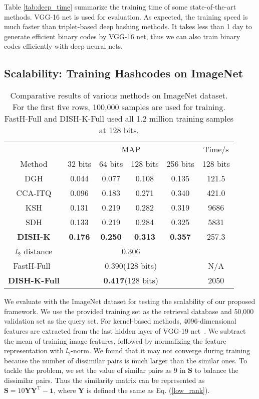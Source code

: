 \documentclass[conference]{IEEEtran}
\begin{document}
Table \ref{tab:deep_time} summarize the training time of some state-of-the-art methods. VGG-16 net is used for evaluation. As expected, the training speed is much faster than triplet-based deep hashing methods. It takes less than 1 day to generate efficient binary codes by VGG-16 net, thus we can also train binary codes efficiently with deep neural nets.


\subsection{Scalability: Training Hashcodes on ImageNet}

\begin{table}[t]
    \centering
    \footnotesize
    \begin{tabular}{c|cccc|c}
        \hline
         & \multicolumn{4}{c|}{MAP} & Time/s \\
        Method & 32 bits & 64 bits & 128 bits & 256 bits & 128 bits \\
        \hline
        DGH & 0.044 & 0.077 & 0.108 & 0.135 & 121.5 \\
        CCA-ITQ & 0.096 & 0.183 & 0.271 & 0.340 & 421.0 \\
        KSH & 0.131 & 0.219 & 0.282 & 0.319 & 9686 \\
        SDH & 0.133 & 0.219 & 0.284 & 0.325 & 5831 \\
        \textbf{DISH-K} & \textbf{0.176} & \textbf{0.250} & \textbf{0.313} & \textbf{0.357} & 257.3 \\
        \hline
        $l_2$ distance & \multicolumn{4}{c|}{0.306} & \\
        \hline
        FastH-Full~\cite{lin2014fast} & \multicolumn{4}{c|}{0.390(128 bits)} & N/A \\
        \textbf{DISH-K-Full} & \multicolumn{4}{c|}{\textbf{0.417}(128 bits)} & 2050 \\
        \hline
    \end{tabular}
    \caption{Comparative results of various methods on ImageNet dataset. For the first five rows, 100,000 samples are used for training. FastH-Full and DISH-K-Full used all 1.2 million training samples at 128 bits.}
    \label{tab:imagenet}
\end{table}

We evaluate with the ImageNet dataset for testing the scalability of our proposed framework. We use the provided training set as the retrieval database and 50,000 validation set as the query set. For kernel-based methods, 4096-dimensional features are extracted from the last hidden layer of VGG-19 net~\cite{simonyan2014very}. We subtract the mean of training image features, followed by normalizing the feature representation with $l_2$-norm. We found that it may not converge during training because the number of dissimilar pairs is much larger than the similar ones. To tackle the problem, we set the value of similar pairs as 9 in $\mathbf{S}$ to balance the dissimilar pairs. Thus the similarity matrix can be represented as $\mathbf{S}=10\mathbf{Y}\mathbf{Y}^\mathrm{T}-\mathbf{1}$, where $\mathbf{Y}$ is defined the same as Eq. (\ref{low_rank}).
\end{document}
